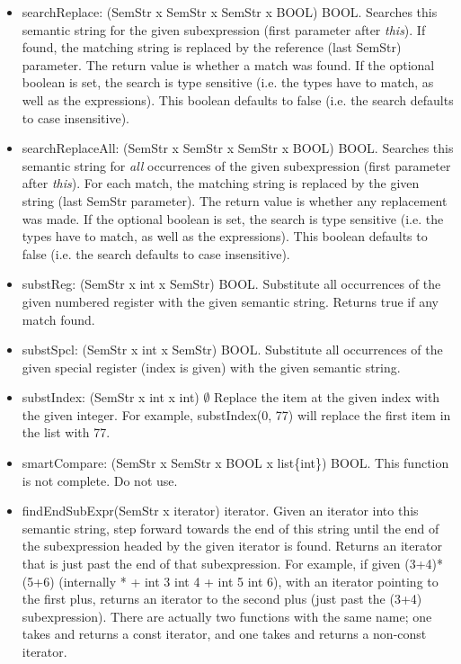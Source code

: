 \begin{itemize}
\item   searchReplace: (SemStr x SemStr x SemStr x BOOL) \ra BOOL.
    Searches this semantic string for the given subexpression (first parameter
    after {\it this}). If found, the matching string is replaced by the
    reference (last SemStr) parameter. The return value is whether a match was
    found.
    If the optional boolean is set, the search is type
    sensitive (i.e. the types have to match, as well as the expressions). This
    boolean defaults to false (i.e. the search defaults to case insensitive).

\item   searchReplaceAll: (SemStr x SemStr x SemStr x BOOL) \ra BOOL.
    Searches this semantic string for {\it all} occurrences of the given
    subexpression (first parameter after {\it this}). For each match, the
    matching string is replaced by the given string (last SemStr parameter).
    The return value is whether any replacement was made.
    If the optional boolean is set, the search is type
    sensitive (i.e. the types have to match, as well as the expressions). This
    boolean defaults to false (i.e. the search defaults to case insensitive).

\item   substReg: (SemStr x int x SemStr) \ra BOOL.
    Substitute all occurrences of the given numbered register with the given
    semantic string. Returns true if any match found.
 
\item   substSpcl: (SemStr x int x SemStr) \ra BOOL.
    Substitute all occurrences of the given special register (index is given)
    with the given semantic string.

\item   substIndex: (SemStr x int x int) \ra $\emptyset$
    Replace the item at the given index with the given integer. For example,
    substIndex(0, 77) will replace the first item in the list with 77.
 
\item   smartCompare: (SemStr x SemStr x BOOL x list\{int\}) \ra BOOL.
    This function is not complete. Do not use.

\item   findEndSubExpr(SemStr x iterator) \ra iterator.
    Given an iterator into this semantic string, step forward towards the end
    of this string until the end of the subexpression headed by the given
    iterator is found. Returns an iterator that is just past the end of that
    subexpression. For example, if given (3+4)*(5+6) (internally
    * + int 3 int 4 + int 5 int 6), with an iterator pointing to the first
    plus, returns an iterator to the second plus (just past the (3+4)
    subexpression).
    There are actually two functions with the same name; one takes and
    returns a const iterator, and one takes and returns a non-const iterator.


\end{itemize}
